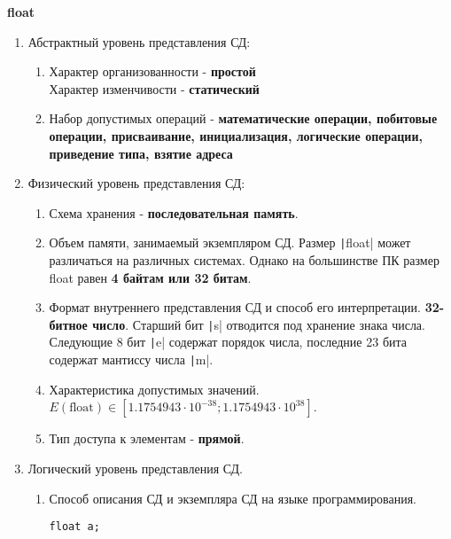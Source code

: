 \documentclass[a4paper,14pt]{extarticle}
\begin{document}
\begin{enumerate}
	      \textbf{float}
	      \begin{enumerate}[label*=\arabic*.]
		      \item Абстрактный уровень представления СД:

		            \begin{enumerate}[label*=\arabic*.]
			            \item Характер организованности - \textbf{простой}\\
			                  Характер изменчивости - \textbf{статический}
			            \item Набор допустимых операций - \textbf{математические операции, побитовые операции, присваивание, инициализация, логические операции,
				                  приведение типа, взятие адреса}
		            \end{enumerate}

		      \item Физический уровень представления СД:

		            \begin{enumerate}[label*=\arabic*.]
			            \item Схема хранения - \textbf{последовательная память}.
			            \item Объем памяти, занимаемый экземпляром СД.
			                  Размер \texttt|float| может различаться на различных системах.
			                  Однако на большинстве ПК размер float равен \textbf{4 байтам или 32 битам}.
			            \item Формат внутреннего представления СД и способ его интерпретации.
			                  \textbf{32-битное число}. Старший бит \texttt|s| отводится под хранение знака числа.
			                  Следующие 8 бит \texttt|e| содержат порядок числа, последние 23 бита содержат мантиссу числа \texttt|m|.
			            \item Характеристика допустимых значений.\\
			                  $E(\text{float}) \in [1.1754943\cdot10^{-38}; 1.1754943\cdot10^{38}]$.
			            \item Тип доступа к элементам - \textbf{прямой}.
		            \end{enumerate}

		      \item Логический уровень представления СД.
		            \begin{enumerate}[label*=\arabic*.]
			            \item Способ описания СД и экземпляра СД на языке программирования.
			                  \begin{verbatim}
float a;
					  \end{verbatim}
		            \end{enumerate}
	      \end{enumerate}


\end{enumerate}
\end{document}

